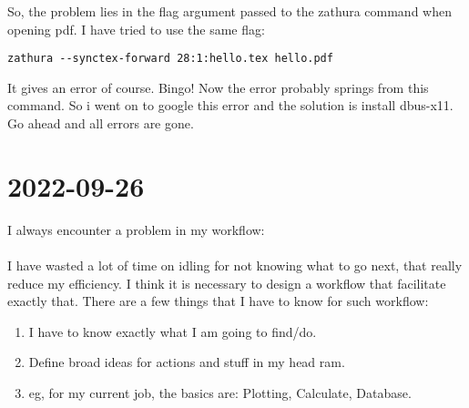\documentclass{article}
\begin{document}
So, the problem lies in the flag argument passed to the zathura command
when opening pdf. I have tried to use the same flag:

\begin{verbatim}
zathura --synctex-forward 28:1:hello.tex hello.pdf
\end{verbatim}

It gives an error of course. Bingo! Now the error probably springs from
this command. So i went on to google this error and the solution is
install dbus-x11. Go ahead and all errors are gone.

\section*{2022-09-26}
I always encounter a problem in my workflow:\\

\noindent{} \newline\\
I have wasted a lot of time on idling for not knowing what to go next, that really reduce my efficiency. 
I think it is necessary to design a workflow that facilitate exactly that. There are a few things that I have to know for such workflow:

\begin{enumerate}
	\item I have to know exactly what I am going to find/do.
	\item Define broad ideas for actions and stuff in my head ram.
	\item eg, for my current job, the basics are: {Plotting}, {Calculate}, {Database}. 
\end{enumerate}
\end{document}
